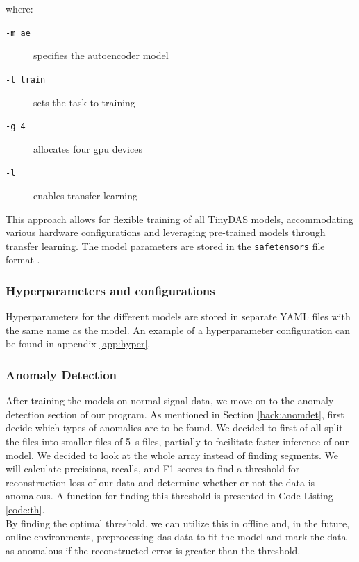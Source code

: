 where:
\begin{description}
\item[\texttt{-m ae}] specifies the autoencoder model
\item[\texttt{-t train}] sets the task to training
\item[\texttt{-g 4}] allocates four \acrshort{gpu} devices
\item[\texttt{-l}] enables transfer learning
\end{description}

This approach allows for flexible training of all TinyDAS models, accommodating various hardware configurations and leveraging pre-trained models through transfer learning. The model parameters are stored in the \texttt{safetensors} file format \cite{safetensors}.

\subsubsection{Hyperparameters and configurations}

Hyperparameters for the different models are stored in separate YAML files with the same name as the model. An example of a hyperparameter configuration can be found in appendix \ref{app:hyper}.


\subsubsection{Anomaly Detection}

After training the models on normal signal data, we move on to the anomaly detection section of our program. As mentioned in Section \ref{back:anomdet}, first decide which types of anomalies are to be found. We decided to first of all split the files into smaller files of \qty{5}{\si{\second}} files, partially to facilitate faster inference of our model. We decided to look at the whole array instead of finding segments. We will calculate precisions, recalls, and F1-scores to find a threshold for reconstruction loss of our data and determine whether or not the data is anomalous. A function for finding this threshold is presented in Code Listing \ref{code:th}.  \\



By finding the optimal threshold, we can utilize this in offline and, in the future, online environments, preprocessing \acrshort{das} data to fit the model and mark the data as anomalous if the reconstructed error is greater than the threshold. 
